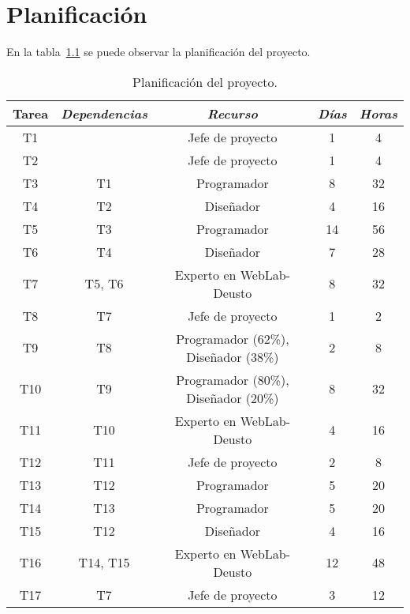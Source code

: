\chapter{Planificación}

En la tabla~\ref{tab:plan} se puede observar la planificación del proyecto.

\begin{table}[h]
	\centering
	\caption{Planificación del proyecto.}\label{tab:plan}
	\begin{tabular}{ccccc}
		\toprule
		\textbf{Tarea} & \emph{Dependencias} & \emph{Recurso} & \emph{Días} & \emph{Horas} \\
		\midrule
		T1	&				& Jefe de proyecto						& 1		&	4	\\
		T2	&				& Jefe de proyecto						& 1		&	4	\\
		T3	&	T1			& Programador							& 8		&	32	\\
		T4	&	T2			& Diseñador								& 4		&	16	\\
		T5	&	T3			& Programador							& 14	&	56	\\
		T6	&	T4			& Diseñador								& 7		&	28	\\
		T7	&	T5, T6		& Experto en WebLab-Deusto				& 8		&	32	\\
		T8	&	T7			& Jefe de proyecto						& 1		&	2	\\
		T9	&	T8			& Programador (62\%), Diseñador (38\%)	& 2		&	8	\\
		T10	&	T9			& Programador (80\%), Diseñador (20\%)	& 8		&	32	\\
		T11	&	T10			& Experto en WebLab-Deusto				& 4		&	16	\\
		T12	&	T11			& Jefe de proyecto						& 2		&	8	\\
		T13	&	T12			& Programador							& 5		&	20	\\
		T14	&	T13			& Programador							& 5		&	20	\\
		T15	&	T12			& Diseñador								& 4		&	16	\\
		T16	&	T14, T15	& Experto en WebLab-Deusto				& 12	&	48	\\
		T17	&	T7			& Jefe de proyecto						& 3		&	12	\\
		\bottomrule
	\end{tabular}
\end{table}
